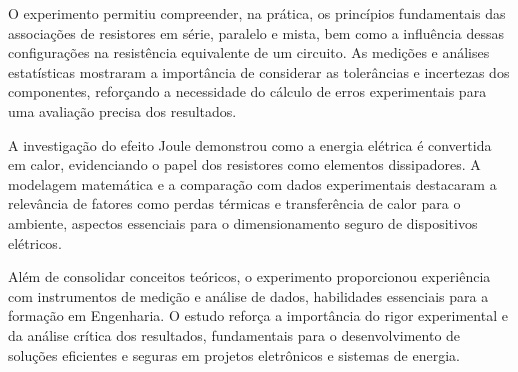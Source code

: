 \documentclass[conference]{IEEEtran}
\begin{document}
O experimento permitiu compreender, na prática, os princípios fundamentais das associações de resistores em série, paralelo e mista, bem como a influência dessas configurações na resistência equivalente de um circuito. As medições e análises estatísticas mostraram a importância de considerar as tolerâncias e incertezas dos componentes, reforçando a necessidade do cálculo de erros experimentais para uma avaliação precisa dos resultados.

A investigação do efeito Joule demonstrou como a energia elétrica é convertida em calor, evidenciando o papel dos resistores como elementos dissipadores. A modelagem matemática e a comparação com dados experimentais destacaram a relevância de fatores como perdas térmicas e transferência de calor para o ambiente, aspectos essenciais para o dimensionamento seguro de dispositivos elétricos.

Além de consolidar conceitos teóricos, o experimento proporcionou experiência com instrumentos de medição e análise de dados, habilidades essenciais para a formação em Engenharia. O estudo reforça a importância do rigor experimental e da análise crítica dos resultados, fundamentais para o desenvolvimento de soluções eficientes e seguras em projetos eletrônicos e sistemas de energia.
\end{document}
